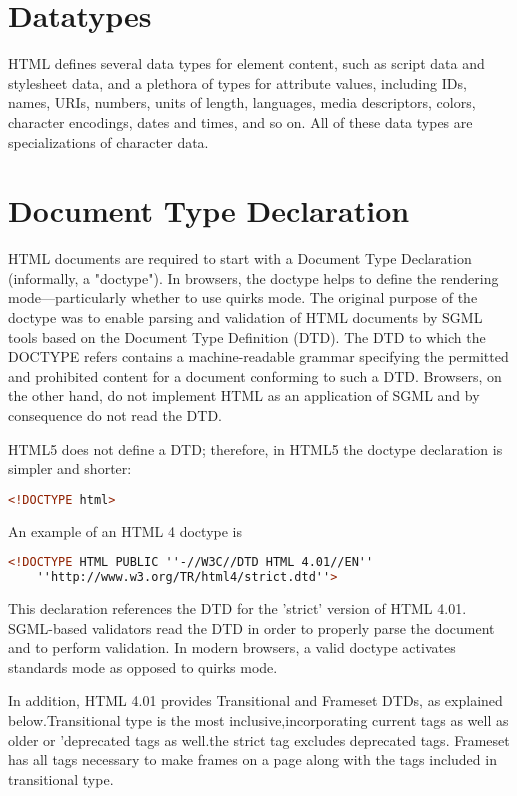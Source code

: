 \section{Datatypes}

HTML defines several data types for element content, such as script data and stylesheet data, and a plethora of types for attribute values, including IDs, names, URIs, numbers, units of length, languages, media descriptors, colors, character encodings, dates and times, and so on. All of these data types are specializations of character data.


\section{Document Type Declaration}

HTML documents are required to start with a Document Type Declaration (informally, a "doctype"). In browsers, the doctype helps to define the rendering mode—particularly whether to use quirks mode.
The original purpose of the doctype was to enable parsing and validation of HTML documents by SGML tools based on the Document Type Definition (DTD). The DTD to which the DOCTYPE refers contains a machine-readable grammar specifying the permitted and prohibited content for a document conforming to such a DTD. Browsers, on the other hand, do not implement HTML as an application of SGML and by consequence do not read the DTD.

HTML5 does not define a DTD; therefore, in HTML5 the doctype declaration is simpler and shorter:


\begin{lstlisting}[language=HTML]
<!DOCTYPE html>
\end{lstlisting}

An example of an HTML 4 doctype is

\begin{lstlisting}[language=HTML]
<!DOCTYPE HTML PUBLIC ''-//W3C//DTD HTML 4.01//EN'' 
	''http://www.w3.org/TR/html4/strict.dtd''>
\end{lstlisting}


This declaration references the DTD for the 'strict' version of HTML 4.01. SGML-based validators read the DTD in order to properly parse the document and to perform validation. In modern browsers, a valid doctype activates standards mode as opposed to quirks mode.

In addition, HTML 4.01 provides Transitional and Frameset DTDs, as explained below.Transitional type is the most inclusive,incorporating current tags as well as older or 'deprecated tags as well.the strict tag excludes deprecated tags. Frameset has all tags necessary to make frames on a page along with the tags included in transitional type.

